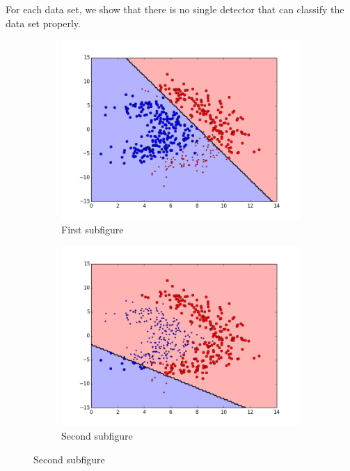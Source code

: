 For each data set, we show that there is no single detector that can classify the data set properly. 

\begin{figure}[t!] %
\begin{subfigure}{0.48\textwidth}
\includegraphics[width=\linewidth]{figs/Lithuanian/20All-Classifiers}
\caption{First subfigure} %
\label{fig:Lithuanian_all_single_a}
\end{subfigure}\hspace*{\fill}
\begin{subfigure}{0.48\textwidth}
\includegraphics[width=\linewidth]{figs/Lithuanian/43All-Classifiers}
\caption{Second subfigure} \label{fig:Lithuanian_all_single_b}
\end{subfigure}


\end{figure}
